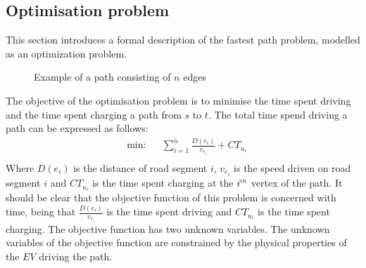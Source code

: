\subsection{Optimisation problem}
This section introduces a formal description of the fastest path problem, modelled as an optimization problem.

\begin{figure}[h!]
\centering
    \caption{Example of a path consisting of $n$ edges} \label{fig:pathexample}
\end{figure}

The objective of the optimisation problem is to minimise the time spent driving
and the time spent charging a path from $s$ to $t$. The total time spend driving a path can be expressed as follows:
\begin{equation*}
\begin{aligned} &
{\text{min:}}
& & \sum_{i=1}^{n} \frac{D(e_i)}{v_{e_i}} + CT_{u_i} \\
\end{aligned}
\end{equation*}\label{eq:objfunction}
Where $D(e_i)$ is the distance of road segment $i$, $v_{e_i}$ is the speed driven on road segment $i$ and $CT_{u_i}$ is the time spent charging at the $i^{\text{\tiny th}}$ vertex of the path. It should be clear that the objective function of this problem is concerned with time, being that $\frac{D(e_i)}{v_{e_i}}$ is the time spent driving and $CT_{u_i}$ is the time spent charging. The objective function has two unknown variables. The unknown variables of the objective function are constrained by the physical properties of the $EV$ driving the path.

